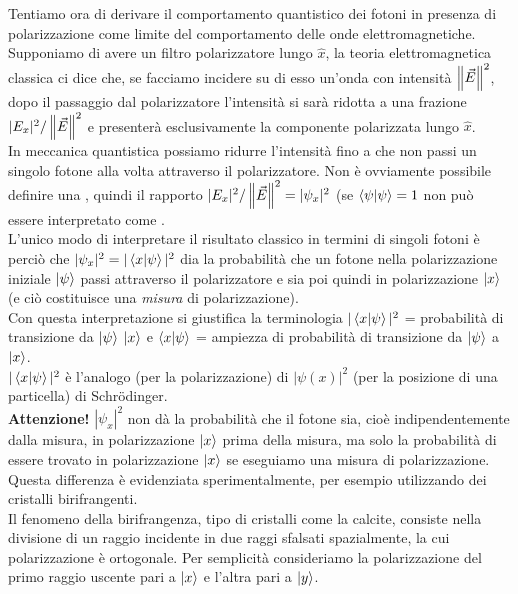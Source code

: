 \documentclass[FisicaTeorica.tex]{subfiles}
\begin{document}
Tentiamo ora di derivare il comportamento quantistico dei fotoni in presenza di polarizzazione come limite  del comportamento delle onde elettromagnetiche.\\
Supponiamo di avere un filtro polarizzatore lungo $\hat{x}$, la teoria elettromagnetica classica ci dice che, se facciamo incidere su di esso un'onda con intensità $\left\lVert\vec{E}\right\rVert^2$, dopo il passaggio dal polarizzatore l'intensità si sarà ridotta a una frazione $|E_x|^2/\left\lVert\vec{E}\right\rVert^2$ 
e presenterà esclusivamente la componente polarizzata lungo $\hat{x}$.\\
In meccanica quantistica possiamo ridurre l'intensità fino a che non passi un singolo fotone alla volta attraverso il polarizzatore. Non è ovviamente possibile definire una , quindi il rapporto $|E_x|^2/\left\lVert\vec{E}\right\rVert^2 = |\psi_x|^2$ (se $\braket{\psi|\psi} = 1$ non può essere interpretato come .\\
L'unico modo di interpretare il risultato classico in termini di singoli fotoni è perciò che $|\psi_x|^2 = |\braket{x|\psi}|^2$ dia la probabilità che un fotone nella polarizzazione iniziale $\ket{\psi}$ passi attraverso il polarizzatore e sia poi quindi in polarizzazione $\ket{x}$ (e ciò costituisce una \textit{misura} di polarizzazione).\\
Con questa interpretazione si giustifica la terminologia $|\braket{x|\psi}|^2$ = probabilità di transizione da $\ket{\psi}$ $\ket{x}$ e $\braket{x|\psi}$ = ampiezza di probabilità di transizione da $\ket{\psi}$ a $\ket{x}$.\\
$|\braket{x|\psi}|^2$ è l'analogo (per la polarizzazione) di $|\psi(x)|^2$ (per la posizione di una particella) di Schrödinger.\\
\textbf{Attenzione!} $|\psi_x|^2$ non dà la probabilità che il fotone sia, cioè indipendentemente dalla misura, in polarizzazione $\ket{x}$ prima della misura, ma solo la probabilità di essere trovato in polarizzazione $\ket{x}$ se eseguiamo una misura di  polarizzazione.\\ 
Questa differenza è evidenziata sperimentalmente, per esempio utilizzando dei cristalli birifrangenti.\\
Il fenomeno della birifrangenza, tipo di cristalli come la calcite, consiste nella divisione di un raggio incidente in due raggi sfalsati spazialmente, la cui polarizzazione è ortogonale. Per semplicità consideriamo la polarizzazione del primo raggio uscente pari a $\ket{x}$ e l'altra pari a $\ket{y}$.\\
\end{document}
